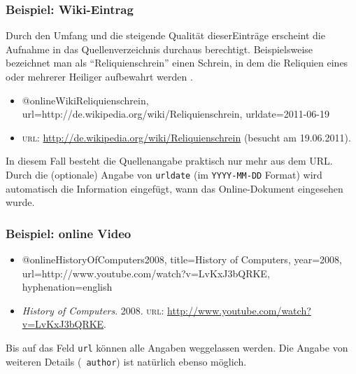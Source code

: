 \subsubsection{Beispiel: Wiki-Eintrag}
\label{sec:@online-www}
Durch den Umfang und die steigende Qualität dieserEinträge erscheint
die Aufnahme in das Quellenverzeichnis durchaus berechtigt.
Beispielsweise bezeichnet man als "`Reliquienschrein"'
einen Schrein, in dem die Reliquien eines oder 
mehrerer Heiliger aufbewahrt werden \cite{WikiReliquienschrein}.
%
\begin{itemize}
\item[]
\begin{GenericCode}[numbers=none]
@online{WikiReliquienschrein,
	url={http://de.wikipedia.org/wiki/Reliquienschrein},
	urldate={2011-06-19}
}
\end{GenericCode}
\item[\cite{WikiReliquienschrein}]
\textsc{url}: \url{http://de.wikipedia.org/wiki/Reliquienschrein}
(besucht am 19.06.{\hskip0pt}2011).
\end{itemize}
%
In diesem Fall besteht die Quellenangabe praktisch nur mehr aus dem URL.
Durch die (optionale) Angabe von \texttt{urldate} (im \texttt{YYYY-MM-DD} Format) wird automatisch die Information eingefügt, wann das Online-Dokument eingesehen wurde.


\subsubsection{Beispiel: online Video} 
\label{sec:@online-video}
%
\begin{itemize}
\item[]
\begin{GenericCode}[numbers=none]
@online{HistoryOfComputers2008,
    title={History of Computers},
    year={2008},
    url={http://www.youtube.com/watch?v=LvKxJ3bQRKE},
    hyphenation={english}
}
\end{GenericCode}
\item[\cite{HistoryOfComputers2008}]
\textit{History of Computers}. 2008. 
\textsc{url}: \url{http://www.youtube.com/watch?v=LvKxJ3bQRKE}.
\end{itemize}
%
Bis auf das Feld \texttt{url} können alle Angaben weggelassen werden. Die Angabe von 
weiteren Details (\zB\ \texttt{author}) ist natürlich ebenso möglich.

